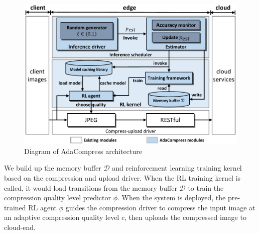 
\begin{figure}[!t]
	\centerline{\includegraphics[width=0.8\linewidth]{figures/overall-diagram.pdf}}
	\caption{Diagram of AdaCompress architecture}
	\label{fig: diagram}
\end{figure}


We build up the memory buffer $ \mathcal{D} $ and reinforcement learning training kernel based on the compression and upload driver. When the RL training kernel is called, it would load transitions from the memory buffer $ \mathcal{D} $ to train the compression quality level predictor $ \phi $. When the system is deployed, the pre-trained RL agent $ \phi $ guides the compression driver to compress the input image at an adaptive compression quality level $ c $, then uploads the compressed image to cloud-end. %

